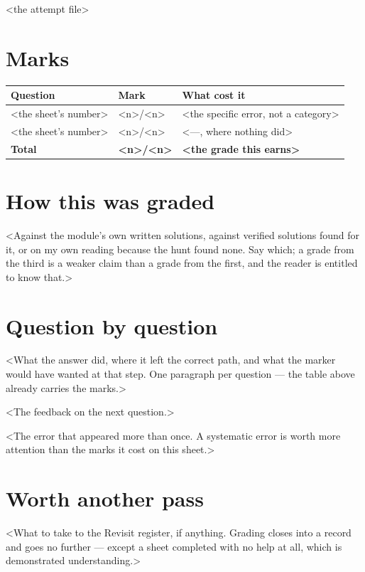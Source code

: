 \documentclass[a4paper,10pt]{article}
\begin{document}
%
  {<the attempt file>}

\section{Marks}
\noindent
\begin{tabular}{@{}llp{9.5cm}@{}}
\textbf{Question} & \textbf{Mark} & \textbf{What cost it} \\
\hline
<the sheet's number> & <n>/<n> & <the specific error, not a category> \\
<the sheet's number> & <n>/<n> & <---, where nothing did> \\
\hline
\textbf{Total} & \textbf{<n>/<n>} & \textbf{<the grade this earns>} \\
\end{tabular}

\section{How this was graded}
<Against the module's own written solutions, against verified solutions found for it, or on my own
reading because the hunt found none. Say which; a grade from the third is a weaker claim than a
grade from the first, and the reader is entitled to know that.>

\section{Question by question}

\begin{question}
<What the answer did, where it left the correct path, and what the marker would have wanted at
that step. One paragraph per question — the table above already carries the marks.>
\end{question}

\begin{question}
<The feedback on the next question.>
\end{question}

\begin{warning}
<The error that appeared more than once. A systematic error is worth more attention than the
marks it cost on this sheet.>
\end{warning}

\section{Worth another pass}
<What to take to the Revisit register, if anything. Grading closes into a record and goes no
further — except a sheet completed with no help at all, which is demonstrated understanding.>
\end{document}
